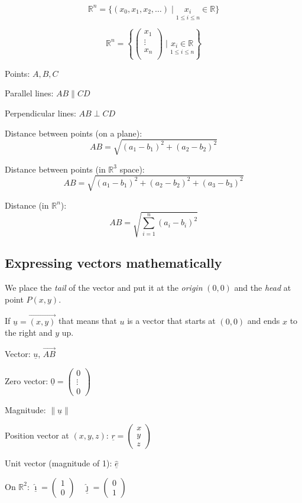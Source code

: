 \documentclass[00_complete]{subfiles}
\begin{document}
$$\mathbb{R}^n = \{(x_0,x_1,x_2,\dots)\;|\;\underset{1 \leq i \leq n}{x_i} \in \mathbb{R}\}$$

$$\mathbb{R}^n=\left\{
\begin{pmatrix}
   x_1 \\
   \vdots \\
   x_n \\
\end{pmatrix} \;|\;
\underset{1 \leq i \leq n}{x_i \in \mathbb{R}}
\right\}$$

Points: $A,B,C$

Parallel lines: $AB \parallel CD$

Perpendicular lines: $AB \perp CD$

Distance between points (on a plane):
$$AB = \sqrt{(a_1-b_1)^2+(a_2-b_2)^2}$$

Distance between points (in $\mathbb{R}^3$ space):
$$AB = \sqrt{(a_1-b_1)^2+(a_2-b_2)^2+(a_3-b_3)^2}$$

Distance (in $\mathbb{R}^n$):
$$AB= \sqrt{\displaystyle\sum_{i=1}^n(a_i-b_i)^2}$$

\subsection{Expressing vectors mathematically}

We place the \emph{tail} of the vector and put it at the \emph{origin} $(0,0)$ and the
\emph{head} at point $P(x,y)$.

If $\underline u = \vec{(x,y)}$ that means that $u$ is a vector that starts at $(0,0)$ and ends $x$ to the right and $y$ up.

\begin{symbols}
Vector: $\underline u$, $\vec{AB}$

Zero vector: $\underline 0 = \begin{pmatrix}
    0 \\
    \vdots \\
    0
\end{pmatrix}$

Magnitude: $\|\underline u\|$

Position vector at $(x,y,z)$: $\underline r =
\begin{pmatrix}
    x \\y\\z
\end{pmatrix}$

Unit vector (magnitude of 1): $\underline{\hat e}$

On $\mathbb{R}^2$: $\underline{\hat \imath} = \begin{pmatrix}
    1\\0
\end{pmatrix}
\quad
\underline{\hat \jmath} =  \begin{pmatrix}
    0\\1
\end{pmatrix}$

\end{symbols}
\end{document}
